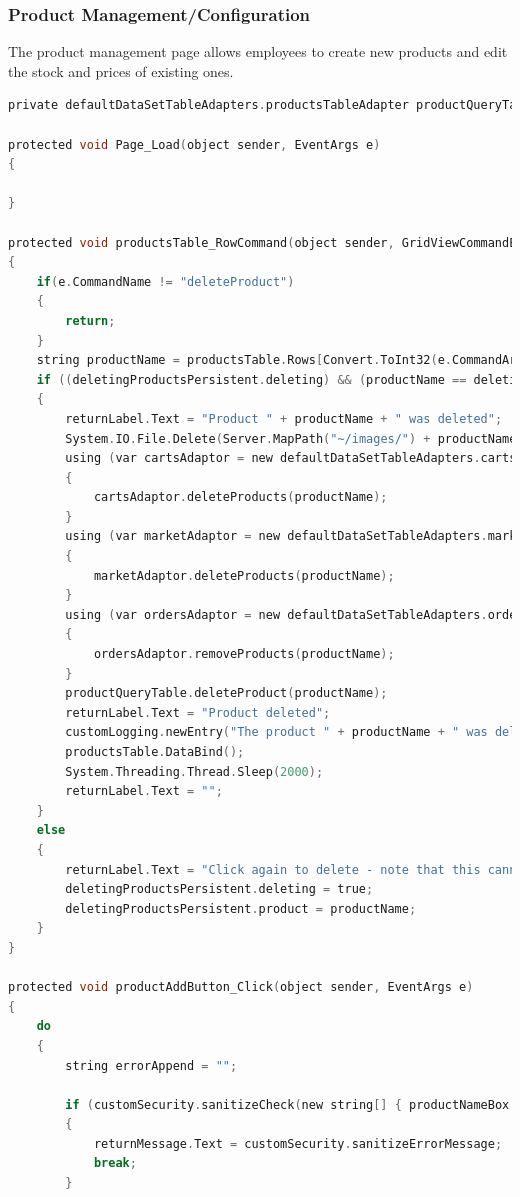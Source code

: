 ﻿\documentclass{article}
\begin{document}
    \subsubsection{Product Management/Configuration}
    The product management page allows employees to create new products and edit the stock and prices of existing ones.
    \begin{lstlisting}[language=C]
private defaultDataSetTableAdapters.productsTableAdapter productQueryTable = new defaultDataSetTableAdapters.productsTableAdapter();

protected void Page_Load(object sender, EventArgs e)
{

}

protected void productsTable_RowCommand(object sender, GridViewCommandEventArgs e)
{
    if(e.CommandName != "deleteProduct")
    {
        return;
    }
    string productName = productsTable.Rows[Convert.ToInt32(e.CommandArgument)].Cells[0].Text;
    if ((deletingProductsPersistent.deleting) && (productName == deletingProductsPersistent.product))
    {
        returnLabel.Text = "Product " + productName + " was deleted";
        System.IO.File.Delete(Server.MapPath("~/images/") + productName);
        using (var cartsAdaptor = new defaultDataSetTableAdapters.cartsTableAdapter())
        {
            cartsAdaptor.deleteProducts(productName);
        }
        using (var marketAdaptor = new defaultDataSetTableAdapters.marketTableAdapter())
        {
            marketAdaptor.deleteProducts(productName);
        }
        using (var ordersAdaptor = new defaultDataSetTableAdapters.ordersTableAdapter())
        {
            ordersAdaptor.removeProducts(productName);
        }
        productQueryTable.deleteProduct(productName);
        returnLabel.Text = "Product deleted";
        customLogging.newEntry("The product " + productName + " was deleted");
        productsTable.DataBind();
        System.Threading.Thread.Sleep(2000);
        returnLabel.Text = "";
    }
    else
    {
        returnLabel.Text = "Click again to delete - note that this cannot be undone!";
        deletingProductsPersistent.deleting = true;
        deletingProductsPersistent.product = productName;
    }
}

protected void productAddButton_Click(object sender, EventArgs e)
{
    do
    {
        string errorAppend = "";

        if (customSecurity.sanitizeCheck(new string[] { productNameBox.Text, productPrice.Text, bandBox.Text, descriptionBox.Text }) != true)
        {
            returnMessage.Text = customSecurity.sanitizeErrorMessage;
            break;
        }


\end{lstlisting}
\end{document}
